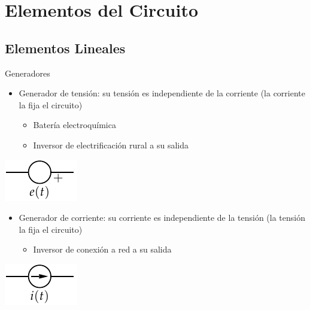 \documentclass[xcolor={usenames,svgnames,dvipsnames}]{beamer}
\begin{document}
\section{Elementos del Circuito}
\label{sec:org7d30c6e}
\subsection{Elementos Lineales}
\label{sec:org3a442c5}

\begin{frame}[label={sec:org2595db3}]{Generadores}
\begin{itemize}
\item \alert{Generador de tensión}: su tensión es independiente de la corriente
(la corriente la fija el circuito)

\begin{itemize}
\item Batería electroquímica

\item Inversor de electrificación rural a su salida
\end{itemize}
\end{itemize}
\begin{center}
\includegraphics[height=0.2\textheight]{../figs/GeneradorTension.pdf}
\end{center}

\begin{itemize}
\item \alert{Generador de corriente}: su corriente es independiente de la tensión
(la tensión la fija el circuito)

\begin{itemize}
\item Inversor de conexión a red a su salida
\end{itemize}
\end{itemize}
\begin{center}
\includegraphics[height=0.2\textheight]{../figs/GeneradorCorriente.pdf}
\end{center}
\end{frame}
\end{document}
